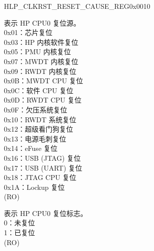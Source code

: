 \addtocounter{Regfloat}{-1}
\begin{register}{H}{LP\_CLKRST\_RESET\_CAUSE\_REG}{0x0010}
\begin{regdesc}\begin{reglist}
\item [接上页...]
\label{fielddesc:LPCLKRSTHPCORE0RESETCAUSE}\item [LP\_CLKRST\_HPCORE0\_RESET\_CAUSE] 表示 HP CPU0 复位源。\\0x01：芯片复位\\0x03：HP 内核软件复位\\0x05：PMU 内核复位\\0x07：MWDT 内核复位\\0x09：RWDT 内核复位\\0x0B：MWDT CPU 复位\\0x0C：软件 CPU 复位\\0x0D：RWDT CPU 复位\\0x0F：欠压系统复位\\0x10：RWDT 系统复位\\0x12：超级看门狗复位\\0x13：电源毛刺复位\\0x14：eFuse 复位\\0x16：USB (JTAG) 复位\\0x17：USB (UART) 复位\\0x18：JTAG CPU 复位\\0x1A：Lockup 复位\\(RO)
\label{fielddesc:LPCLKRSTHPCORE0RESETFLAG}\item [LP\_CLKRST\_HPCORE0\_RESET\_FLAG] 表示 HP CPU0 复位标志。\\0：未复位\\1：已复位\\(RO)
\item [见下页...]
\end{reglist}\end{regdesc}
\end{register}
 
